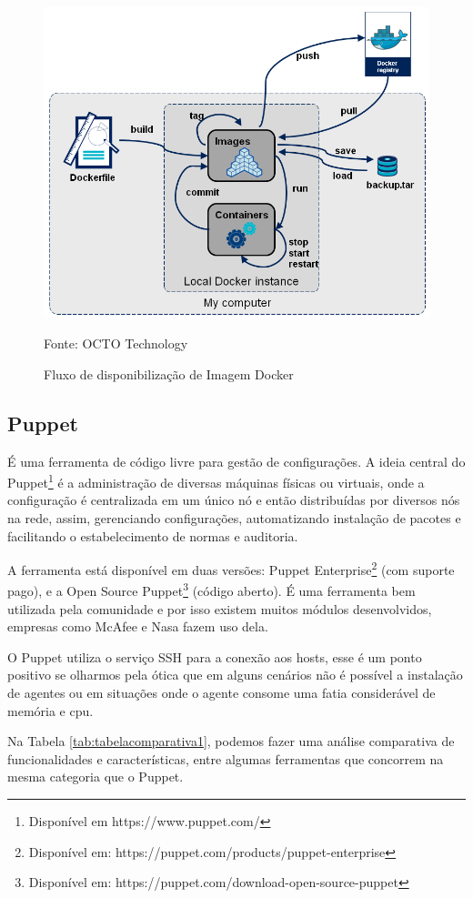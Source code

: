 \begin{figure}[htb]
	\centering
	\includegraphics[width=0.7\linewidth]{imagens/docker-stages}
	\caption{Fluxo de disponibilização de Imagem Docker}
	Fonte: OCTO Technology\footnotemark	
	\label{fig:docker-stages}
	
\end{figure}
\newpage
\subsection{Puppet}
É uma ferramenta de código livre para gestão de configurações. A ideia central do Puppet\footnote{Disponível em https://www.puppet.com/} é a administração de diversas máquinas físicas ou virtuais, onde a configuração é centralizada em um único nó e então distribuídas por diversos nós na rede, assim, gerenciando configurações, automatizando instalação de pacotes e facilitando o estabelecimento de normas e auditoria.\cite{walberg2008automate}

A ferramenta está disponível em duas versões: Puppet Enterprise\footnote{Disponível em: https://puppet.com/products/puppet-enterprise} (com suporte pago), e a Open Source Puppet\footnote{Disponível em: https://puppet.com/download-open-source-puppet} (código aberto). É uma ferramenta bem utilizada pela comunidade e por isso existem muitos módulos desenvolvidos, empresas como McAfee e Nasa fazem uso dela.

O Puppet utiliza o serviço SSH para a conexão aos hosts, esse é um ponto positivo se olharmos pela ótica que em alguns cenários não é possível a instalação de agentes ou em situações onde o agente consome uma fatia considerável de memória e cpu.\cite{puppet}

Na Tabela \ref{tab:tabelacomparativa1}, podemos fazer uma análise comparativa de funcionalidades e características, entre algumas ferramentas que concorrem na mesma categoria que o Puppet.

